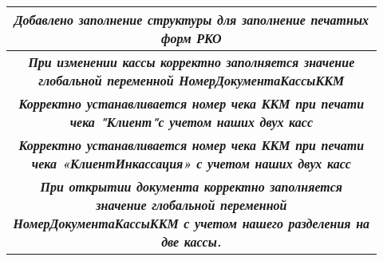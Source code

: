 \begin{longtable}{|p{0.02\linewidth}|p{0.3\linewidth}|p{0.3\linewidth}|p{0.3\linewidth}|}

   \hline

   \multicolumn{4}{|c|}{\textbf{\textit{Добавлено заполнение структуры для заполнение печатных форм РКО}}} \\



   \hline

   \multicolumn{4}{|c|}{\textbf{\textit{При изменении кассы корректно заполняется значение глобальной переменной НомерДокументаКассыККМ}}} \\



   \hline

   \multicolumn{4}{|c|}{\textbf{\textit{Корректно устанавливается номер чека ККМ при печати чека "Клиент"с учетом наших двух касс}}} \\



   \hline

   \multicolumn{4}{|c|}{\textbf{\textit{Корректно устанавливается номер чека ККМ при печати чека «КлиентИнкассация» с учетом наших двух касс}}} \\


    \hline

    \multicolumn{4}{|c|}{\textbf{\textit{При открытии документа корректно заполняется значение глобальной переменной НомерДокументаКассыККМ с учетом нашего разделения на две кассы.}}} \\
    \hline

\end{longtable}
